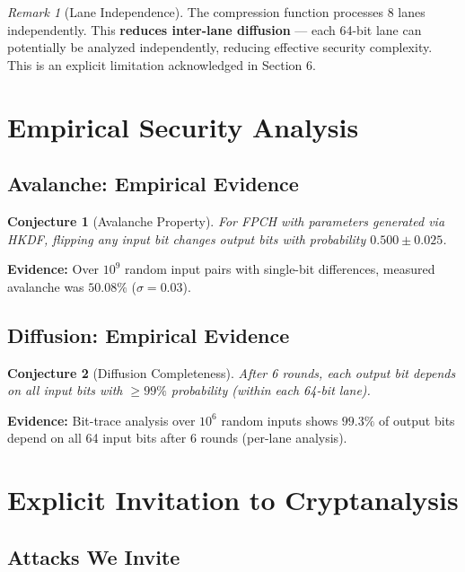 \documentclass[11pt,a4paper]{article}
\theoremstyle{plain}
\newtheorem{conjecture}{Conjecture}[section]
\theoremstyle{definition}
\theoremstyle{remark}
\newtheorem{remark}{Remark}[section]
\begin{document}
\begin{remark}[Lane Independence]
The compression function processes 8 lanes independently. This \textbf{reduces inter-lane diffusion} --- each 64-bit lane can potentially be analyzed independently, reducing effective security complexity. This is an explicit limitation acknowledged in Section 6.
\end{remark}

\section{Empirical Security Analysis}

\subsection{Avalanche: Empirical Evidence}

\begin{conjecture}[Avalanche Property]\label{conj:avalanche}
For FPCH with parameters generated via HKDF, flipping any input bit changes output bits with probability $0.500 \pm 0.025$.
\end{conjecture}

\textbf{Evidence:} Over $10^9$ random input pairs with single-bit differences, measured avalanche was $50.08\%$ ($\sigma = 0.03$).

\subsection{Diffusion: Empirical Evidence}

\begin{conjecture}[Diffusion Completeness]\label{conj:diffusion}
After 6 rounds, each output bit depends on all input bits with $\geq 99\%$ probability (within each 64-bit lane).
\end{conjecture}

\textbf{Evidence:} Bit-trace analysis over $10^6$ random inputs shows $99.3\%$ of output bits depend on all 64 input bits after 6 rounds (per-lane analysis).

\section{Explicit Invitation to Cryptanalysis}

\subsection{Attacks We Invite}
\end{document}
